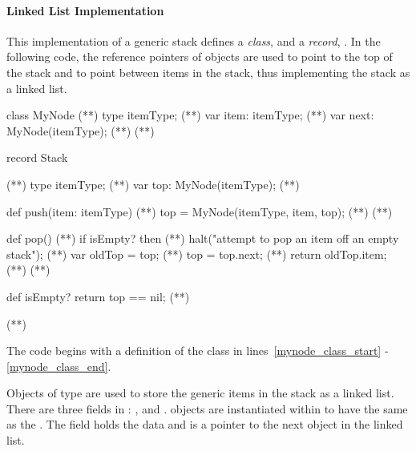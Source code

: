\paragraph{Linked List Implementation}
This implementation of a generic stack defines a {\em class},
 and a {\em record}, .  In the following
code, the reference pointers of  objects are used to point to
the top of the stack and to point between items in the stack,
thus implementing the stack as a linked list.

\begin{numberedchapel}
class MyNode {                      (*\label{mynode_class_start}*)
  type itemType;                    (*\label{mynode_itemtype}*)
  var item: itemType;               (*\label{mynode_item}*)
  var next: MyNode(itemType);       (*\label{mynode_next}*)
}                                   (*\label{mynode_class_end}*)

record Stack {                      (*\label{stack_list_start}*)
  type itemType;                    (*\label{stack_list_itemtype}*)
  var top: MyNode(itemType);        (*\label{stack_list_top}*)

  def push(item: itemType) {        (*\label{stack_list_push_start}*)
    top = MyNode(itemType, item, top); (*\label{stack_list_push_top}*)
  }                                 (*\label{stack_list_push_end}*)

  def pop() {                       (*\label{stack_list_pop_start}*)
    if isEmpty? then                (*\label{stack_list_pop_empty_1}*)
      halt("attempt to pop an item off an empty stack"); (*\label{stack_list_empty_2}*)
    var oldTop = top;               (*\label{stack_list_pop_oldtop}*)
    top = top.next;                 (*\label{stack_list_pop_newtop}*)
    return oldTop.item;             (*\label{stack_list_pop_return}*)
  }                                 (*\label{stack_list_pop_end}*)

  def isEmpty? return top == nil;   (*\label{stack_list_isempty}*)
}                                  (*\label{stack_list_end}*)
\end{numberedchapel}

The code begins with a definition of the  class in 
lines~\ref{mynode_class_start} - \ref{mynode_class_end}.  
\begin{chapel}
class MyNode {                      
  type itemType;                   
  var item: itemType;             
  var next: MyNode(itemType);    
\end{chapel}
Objects of type  are used to store the generic items in the stack
as a linked list.  There are three fields in :  , 
 and
.   objects are instantiated within  to
have the same  as the .  The  field
holds the data and  is a pointer to the next  object
in the linked list.

